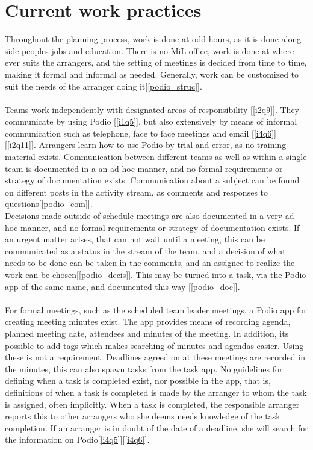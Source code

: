 \section{Current work practices}
Throughout the planning process, work is done at odd hours, as it is done along side peoples jobs and education. There is no MiL office, work is done at where ever suits the arrangers, and the setting of meetings is decided from time to time, making it formal and informal as needed. Generally, work can be customized to suit the needs of the arranger doing it[\ref{podio_struc}].
\\ \\
Teams work independently with designated areas of responsibility [\ref{i2q9}]. They communicate by using Podio [\ref{i1q5}], but also extensively by means of informal communication such as telephone, face to face meetings and email [\ref{i4q6}] [\ref{i2q11}]. Arrangers learn how to use Podio by trial and error, as no training material exists. Communication between different teams as well as within a single team is documented in a an ad-hoc manner, and no formal requirements or strategy of documentation exists. Communication about a subject can be found on different posts in the activity stream, as comments and responses to questions[\ref{podio_com}]. 
\\
Decisions made outside of schedule meetings are also documented in a very ad-hoc manner, and no formal requirements or strategy of documentation exists. If an urgent matter arises, that can not wait until a meeting, this can be communicated as a status in the stream of the team, and a decision of what needs to be done can be taken in the comments, and an assignee to realize the work can be chosen[\ref{podio_decis}]. This may be turned into a task, via the Podio app of the same name, and documented this way [\ref{podio_doc}].
\\ \\
For formal meetings, such as the scheduled team leader meetings, a Podio app for creating meeting minutes exist. The app provides means of recording agenda, planned meeting date, attendees and minutes of the meeting. In addition, its possible to add tags which makes searching of minutes and agendas easier. Using these is not a requirement. Deadlines agreed on at these meetings are recorded in the minutes, this can also spawn tasks from the task app. No guidelines for defining when a task is completed exist, nor possible in the app, that is, definitions of when a task is completed is made by the arranger to whom the task is assigned, often implicitly. When a task is completed, the responsible arranger reports this to other arrangers who she deems needs knowledge of the task completion. If an arranger is in doubt of the date of a deadline, she will search for the information on Podio[\ref{i4q5}][\ref{i4q6}].
